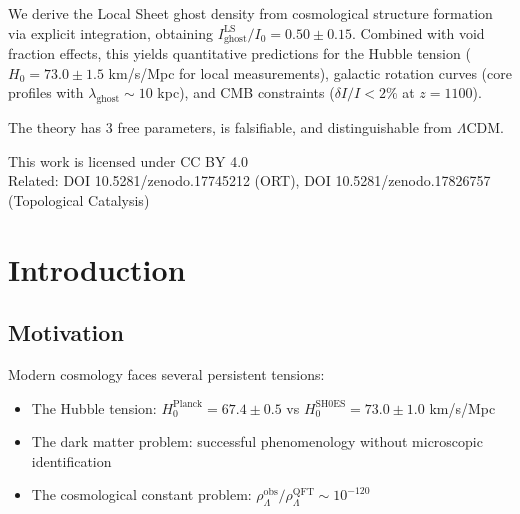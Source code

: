 \documentclass[12pt, a4paper]{article}
\begin{document}
\begin{titlepage}
\begin{tcolorbox}[colback=blue!5!white, colframe=blue!75!black, width=0.95\textwidth]
We derive the Local Sheet ghost density from cosmological structure formation via explicit integration, obtaining $I_{\text{ghost}}^{\text{LS}}/I_0 = 0.50 \pm 0.15$. Combined with void fraction effects, this yields quantitative predictions for the Hubble tension ($H_0 = 73.0 \pm 1.5$ km/s/Mpc for local measurements), galactic rotation curves (core profiles with $\lambda_{\text{ghost}} \sim 10$ kpc), and CMB constraints ($\delta I/I < 2\%$ at $z=1100$).

The theory has 3 free parameters, is falsifiable, and distinguishable from $\Lambda$CDM.

\end{tcolorbox}

\vfill

{\small This work is licensed under CC BY 4.0}\\[0.2cm]
{\small Related: DOI 10.5281/zenodo.17745212 (ORT), DOI 10.5281/zenodo.17826757 (Topological Catalysis)}

\end{titlepage}


\tableofcontents
\newpage


\section{Introduction}

\subsection{Motivation}

Modern cosmology faces several persistent tensions:
\begin{itemize}
    \item The Hubble tension: $H_0^{\text{Planck}} = 67.4 \pm 0.5$ vs $H_0^{\text{SH0ES}} = 73.0 \pm 1.0$ km/s/Mpc
    \item The dark matter problem: successful phenomenology without microscopic identification
    \item The cosmological constant problem: $\rho_\Lambda^{\text{obs}}/\rho_\Lambda^{\text{QFT}} \sim 10^{-120}$
\end{itemize}
\end{document}

